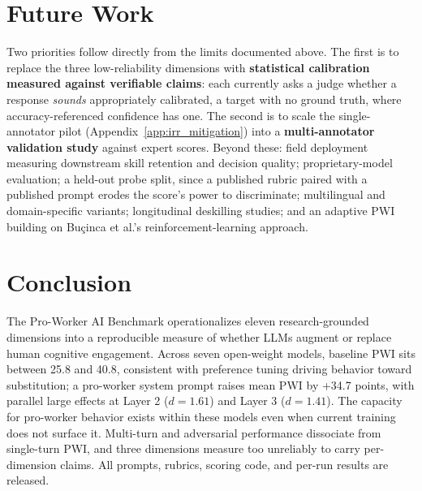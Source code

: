 \documentclass{article}
\begin{document}
\section{Future Work}
\label{sec:future}

Two priorities follow directly from the limits documented above. The first is to replace the three low-reliability dimensions with \textbf{statistical calibration measured against verifiable claims}: each currently asks a judge whether a response \emph{sounds} appropriately calibrated, a target with no ground truth, where accuracy-referenced confidence has one. The second is to scale the single-annotator pilot (Appendix~\ref{app:irr_mitigation}) into a \textbf{multi-annotator validation study} against expert scores. Beyond these: field deployment measuring downstream skill retention and decision quality; proprietary-model evaluation; a held-out probe split, since a published rubric paired with a published prompt erodes the score's power to discriminate; multilingual and domain-specific variants; longitudinal deskilling studies; and an adaptive PWI building on Bu\c{c}inca et al.'s \cite{bucinca2024towards} reinforcement-learning approach.


\section{Conclusion}
\label{sec:conclusion}

The Pro-Worker AI Benchmark operationalizes eleven research-grounded dimensions into a reproducible measure of whether LLMs augment or replace human cognitive engagement. Across seven open-weight models, baseline PWI sits between 25.8 and 40.8, consistent with preference tuning driving behavior toward substitution; a pro-worker system prompt raises mean PWI by +34.7 points, with parallel large effects at Layer 2 ($d = 1.61$) and Layer 3 ($d = 1.41$). The capacity for pro-worker behavior exists within these models even when current training does not surface it. Multi-turn and adversarial performance dissociate from single-turn PWI, and three dimensions measure too unreliably to carry per-dimension claims. All prompts, rubrics, scoring code, and per-run results are released.
\end{document}
